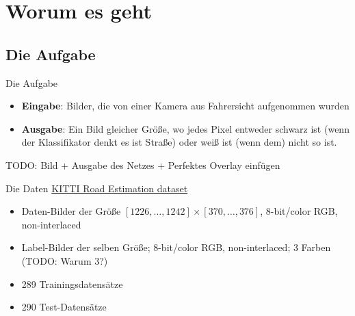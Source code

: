 \section{Worum es geht}

\subsection{Die Aufgabe}

\begin{frame}{Die Aufgabe}
    \begin{itemize}
        \item \textbf{Eingabe}: Bilder, die von einer Kamera aus Fahrersicht
              aufgenommen wurden
        \item \textbf{Ausgabe}: Ein Bild gleicher Größe, wo jedes Pixel
              entweder schwarz ist (wenn der Klassifikator denkt es ist Straße)
              oder weiß ist (wenn dem) nicht so ist.
    \end{itemize}

    TODO: Bild + Ausgabe des Netzes + Perfektes Overlay einfügen
\end{frame}

\begin{frame}{Die Daten}
    \href{http://www.cvlibs.net/datasets/kitti/eval_road.php}{KITTI Road Estimation dataset}
    \begin{itemize}
        \item Daten-Bilder der Größe $[1226, \dots, 1242] \times [370, \dots, 376]$,
              8-bit/color RGB, non-interlaced
        \item Label-Bilder der selben Größe; 8-bit/color RGB, non-interlaced;
              3 Farben (TODO: Warum 3?)
        \item 289 Trainingsdatensätze
        \item 290 Test-Datensätze
    \end{itemize}
\end{frame}
